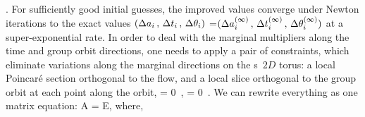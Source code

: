 \etc.
For sufficiently good initial guesses,
the improved values converge under Newton iterations to
the exact values
$(\Delta a_i\,,\,\Delta t_i\,,\,\Delta{\bf \theta}_i)$
=$(\Delta a_i^{(\infty)}\,,\,\Delta t_i^{(\infty)}\,,\,\Delta{\bf \theta}_i^{(\infty)})$
at a super-exponential rate.
%
In order to deal with the marginal multipliers along the time and group
orbit directions, one needs to apply a pair of constraints, which
eliminate variations along the marginal directions on the \rpo s\ $2D$
torus: a local Poincar\'e section orthogonal to the flow, and a local slice
orthogonal to the group orbit at each point along the orbit,
\beq
    = 0
\,,\qquad
    = 0
\,.
We can rewrite everything as one matrix equation:
\beq \label{eq:multishootmatrix}
	A \Delta = E, \quad \mbox{where,}
\eeq
